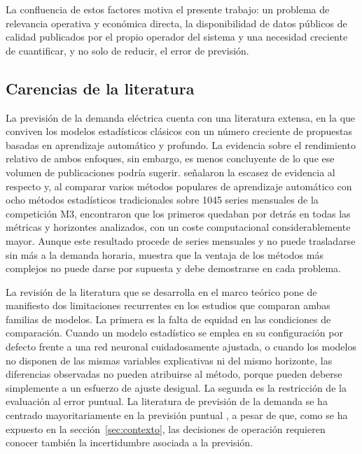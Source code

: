 La confluencia de estos factores motiva el presente trabajo: un problema de
relevancia operativa y económica directa, la disponibilidad de datos públicos
de calidad publicados por el propio operador del sistema y una necesidad
creciente de cuantificar, y no solo de reducir, el error de previsión.

\subsection{Carencias de la literatura}\label{sec:carencias}

La previsión de la demanda eléctrica cuenta con una literatura extensa, en la
que conviven los modelos estadísticos clásicos con un número creciente de
propuestas basadas en aprendizaje automático y profundo. La evidencia sobre
el rendimiento relativo de ambos enfoques, sin embargo, es menos concluyente
de lo que ese volumen de publicaciones podría sugerir.
\textcite{makridakis2018statistical} señalaron la escasez de evidencia al
respecto y, al comparar varios métodos populares de aprendizaje automático con
ocho métodos estadísticos tradicionales sobre 1045 series mensuales de la
competición M3, encontraron que los primeros quedaban por detrás en todas las
métricas y horizontes analizados, con un coste computacional
considerablemente mayor. Aunque este resultado procede de series mensuales y
no puede trasladarse sin más a la demanda horaria, muestra que la ventaja de
los métodos más complejos no puede darse por supuesta y debe demostrarse en
cada problema.

La revisión de la literatura que se desarrolla en el marco teórico pone de
manifiesto dos limitaciones recurrentes en los estudios que comparan ambas
familias de modelos. La primera es la falta de equidad en las condiciones de
comparación. Cuando un modelo estadístico se emplea en su configuración por
defecto frente a una red neuronal cuidadosamente ajustada, o cuando los
modelos no disponen de las mismas variables explicativas ni del mismo
horizonte, las diferencias observadas no pueden atribuirse al método, porque
pueden deberse simplemente a un esfuerzo de ajuste desigual. La segunda es la
restricción de la evaluación al error puntual. La literatura de previsión de
la demanda se ha centrado mayoritariamente en la previsión puntual
\parencite{hong2016probabilistic}, a pesar de que, como se ha expuesto en la
sección~\ref{sec:contexto}, las decisiones de operación requieren conocer
también la incertidumbre asociada a la previsión.

